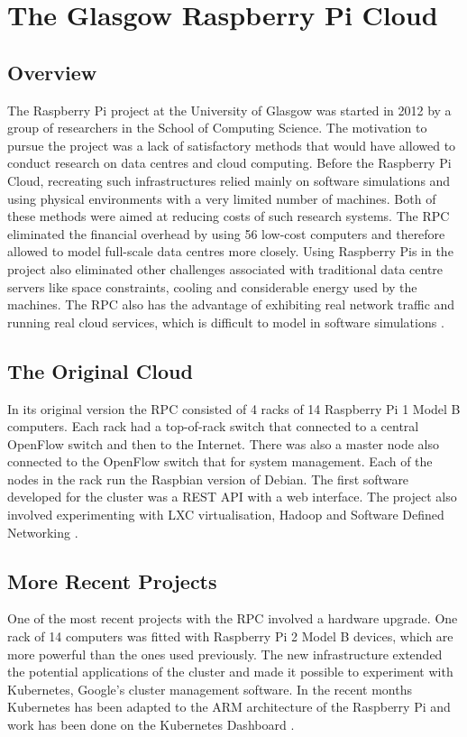\documentclass{l4proj}
\begin{document}
\section{The Glasgow Raspberry Pi Cloud}
\label{the_glasgow_picloud}
\subsection{Overview}
The Raspberry Pi project at the University of Glasgow was started in 2012 by a group of researchers in the School of Computing Science. The motivation to pursue the project was a lack of satisfactory methods that would have allowed to conduct research on data centres and cloud computing. Before the Raspberry Pi Cloud, recreating such infrastructures relied mainly on software simulations and using physical environments with a very limited number of machines. Both of these methods were aimed at reducing costs of such research systems. The RPC eliminated the financial overhead by using 56 low-cost computers and therefore allowed to model full-scale data centres more closely. Using Raspberry Pis in the project also eliminated other challenges associated with traditional data centre servers like space constraints, cooling and considerable energy used by the machines. The RPC also has the advantage of exhibiting real network traffic and running real cloud services, which is difficult to model in software simulations \cite{tso_white_jouet_singer_pezaros_2013}.

\subsection{The Original Cloud}
In its original version the RPC consisted of 4 racks of 14 Raspberry Pi 1 Model B computers. Each rack had a top-of-rack switch that connected to a central OpenFlow switch and then to the Internet. There was also a master node also connected to the OpenFlow switch that for system management. Each of the nodes in the rack run the Raspbian version of Debian. The first software developed for the cluster was a REST API with a web interface. The project also involved experimenting with LXC virtualisation, Hadoop and Software Defined Networking \cite{white_2013}.

\subsection{More Recent Projects}
One of the most recent projects with the RPC involved a hardware upgrade. One rack of 14 computers was fitted with Raspberry Pi 2 Model B devices, which are more powerful than the ones used previously. The new infrastructure extended the potential applications of the cluster and made it possible to experiment with Kubernetes, Google's cluster management software. In the recent months Kubernetes has been adapted to the ARM architecture of the Raspberry Pi \cite{walker_2015} and work has been done on the Kubernetes Dashboard \cite{mcwha_2016}.
\end{document}

